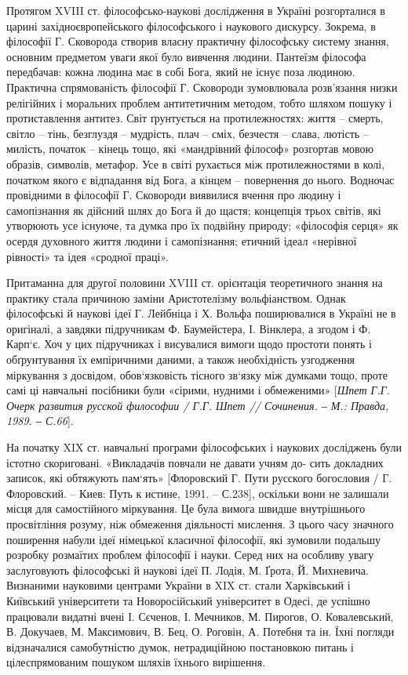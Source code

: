 Протягом XVIII ст. філософсько-наукові дослідження в Україні
розгорталися в царині західноєвропейського філософського і наукового
дискурсу. Зокрема, в філософії Г. Сковорода створив власну практичну
філософську систему знання, основним предметом уваги якої було вивчення
людини. Пантеїзм філософа передбачав: кожна людина має в собі Бога, який не
існує поза людиною. Практична спрямованість філософії Г. Сковороди
зумовлювала розв’язання низки релігійних і моральних проблем антитетичним
методом, тобто шляхом пошуку і протиставлення антитез. Світ ґрунтується на
протилежностях: життя – смерть, світло – тінь, безглуздя – мудрість, плач –
сміх, безчестя – слава, лютість – милість, початок – кінець тощо, які
«мандрівний філософ» розгортав мовою образів, символів, метафор. Усе в світі
рухається між протилежностями в колі, початком якого є відпадання від Бога, а
кінцем – повернення до нього. Водночас провідними в філософії Г. Сковороди
виявилися вчення про людину і самопізнання як дійсний шлях до Бога й до
щастя; концепція трьох світів, які утворюють усе існуюче, та думка про їх
подвійну природу; «філософія серця» як осердя духовного життя людини і
самопізнання; етичний ідеал «нерівної рівності» та ідея «сродної праці».

Притаманна для другої половини XVIII ст. орієнтація теоретичного знання
на практику стала причиною заміни Аристотелізму вольфіанством. Однак
філософські й наукові ідеї Г. Лейбніца і Х. Вольфа поширювалися в Україні не
в оригіналі, а завдяки підручникам Ф. Баумейстера, І. Вінклера, а згодом і
Ф. Карп`є. Хоч у цих підручниках і висувалися вимоги щодо простоти понять і
обґрунтування їх емпіричними даними, а також необхідність узгодження
міркування з досвідом, обов`язковість тісного зв`язку між думками тощо, проте
самі ці навчальні посібники були «сірими, нудними і обмеженими» [\textit{Шпет Г.Г.
Очерк развития русской философии / Г.Г. Шпет // Сочинения. ‒ М.: Правда,
1989. ‒ С.66}].

На початку XIX ст. навчальні програми філософських і наукових
досліджень були істотно скориговані. «Викладачів повчали не давати учням до-
сить докладних записок, які обтяжують пам`ять» [Флоровский Г. Пути русского
богословия / Г. Флоровский. – Киев: Путь к истине, 1991. – С.238], оскільки
вони не залишали місця для самостійного міркування. Це була вимога швидше
внутрішнього просвітління розуму, ніж обмеження діяльності мислення. З
цього часу значного поширення набули ідеї німецької класичної філософії, які
зумовили подальшу розробку розмаїтих проблем філософії і науки. Серед них
на особливу увагу заслуговують філософські й наукові ідеї П. Лодія, М. Ґрота,
Й. Михневича. Визнаними науковими центрами України в XIX ст. стали
Харківський і Київський університети та Новоросійський університет в Одесі,
де успішно працювали видатні вчені І. Сєченов, І. Мечников, М. Пирогов, О.
Ковалевський, В. Докучаев, М. Максимович, В. Бец, О. Роговін, А. Потебня та
ін. Їхні погляди відзначалися самобутністю думок, нетрадиційною постановкою
питань і цілеспрямованим пошуком шляхів їхнього вирішення.

